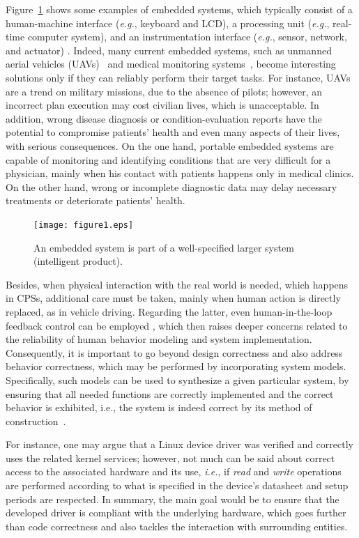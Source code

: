 \documentclass{acm_sen_article}
\begin{document}
Figure~\ref{intelligent-product} shows some examples of embedded systems, which typically consist of a human-machine interface ({\it e.g.}, keyboard and LCD), a processing unit ({\it e.g.}, real-time computer system), and an instrumentation interface ({\it e.g.}, sensor, network, and actuator) \cite{Kopetz11}. Indeed, many current embedded systems, such as unmanned aerial vehicles (UAVs)~\cite{groza2015formal} and medical monitoring systems~\cite{Cordeiro09}, become interesting solutions only if they can reliably perform their target tasks. For instance, UAVs are a trend on military missions, due to the absence of pilots; however, an incorrect plan execution may cost civilian lives, which is unacceptable. In addition, wrong disease diagnosis or condition-evaluation reports have the potential to compromise patients' health and even many aspects of their lives, with serious consequences. On the one hand, portable embedded systems are capable of monitoring and identifying conditions that are very difficult for a physician, mainly when his contact with patients happens only in medical clinics. On the other hand, wrong or incomplete diagnostic data may delay necessary treatments or deteriorate patients' health. 
%
\begin{figure}[!t]
	\centering
	\texttt{[image: figure1.eps]}
	\caption{An embedded system is part of a well-specified larger system (intelligent product).}
	\label{intelligent-product}
\end{figure}

Besides, when physical interaction with the real world is needed, which happens in CPSs, additional care must be taken, mainly when human action is directly replaced, as in vehicle driving. Regarding the latter, even human-in-the-loop feedback control can be employed \cite{munir}, which then raises deeper concerns related to the reliability of human behavior modeling and system implementation. Consequently, it is important to go beyond design correctness and also address behavior correctness, which may be performed by incorporating system models. Specifically, such models can be used to synthesize a given particular system, by ensuring that all needed functions are correctly implemented and the correct behavior is exhibited, {i.e.}, the system is indeed correct by its method of construction~\cite{Abate17}.

For instance, one may argue that a Linux device driver \cite{ldd} was verified and correctly uses the related kernel services; however, not much can be said about correct access to the associated hardware and its use, {\it i.e.}, if \textit{read} and \textit{write} operations are performed according to what is specified in the device's datasheet and setup periods are respected. In summary, the main goal would be to ensure that the developed driver is compliant with the underlying hardware, which goes further than code correctness and also tackles the interaction with surrounding entities.
\end{document}
